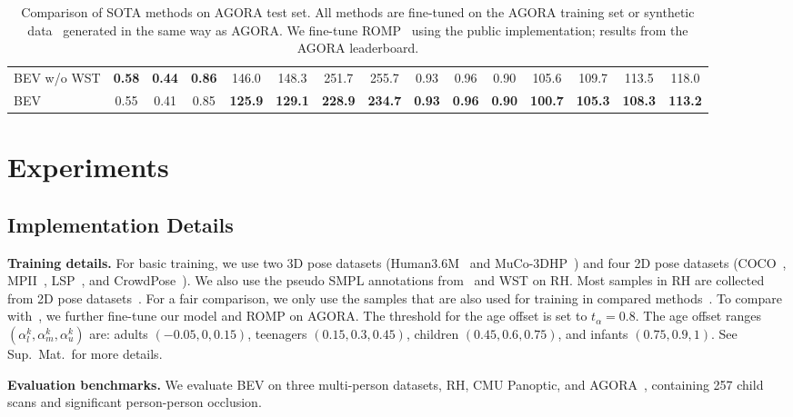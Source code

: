 \documentclass[10pt,twocolumn,letterpaper]{article}
\begin{document}
\begin{table*}[t]
\begin{tabular}{l|ccc|cc|cc|ccc|cc|cc}
BEV w/o WST  & \textbf{0.58} & \textbf{0.44} & \textbf{0.86} & 146.0 & 148.3 & 251.7 & 255.7 & 0.93 & 0.96 & 0.90 & 105.6 & 109.7 & 113.5 & 118.0\\
BEV  & 0.55 & 0.41 & 0.85 & \textbf{125.9} &\textbf{129.1} & \textbf{228.9} & \textbf{234.7} & \textbf{0.93} & \textbf{0.96} & \textbf{0.90} & \textbf{100.7} & \textbf{105.3} & \textbf{108.3} & \textbf{113.2} \\
\bottomrule
\end{tabular}
\vspace{-0.1in}
	\caption{Comparison of SOTA methods on AGORA test set. All methods are fine-tuned on the AGORA training set or synthetic data~\cite{Kocabas_SPEC_2021} generated in the same way as AGORA. We fine-tune ROMP~\cite{romp} using the public implementation; results from  the AGORA leaderboard.}
	\label{tab:agora}
\end{table*}



\section{Experiments}
\label{sec:experiments}

\subsection{Implementation Details}

\textbf{Training details.}
For basic training, we use two 3D pose datasets (Human3.6M~\cite{h36m} and MuCo-3DHP~\cite{mehta2018single}) and four 2D pose datasets (COCO~\cite{coco}, MPII~\cite{mpii}, LSP~\cite{lsp_extended}, and CrowdPose~\cite{crowdpose}). 
We also use the pseudo SMPL annotations from~\cite{joo2020eft} and WST on RH.
Most samples in RH are collected from 2D pose datasets~\cite{coco,crowdpose,zhang2019pose2seg}.
For a fair comparison, we only use the samples that are also used for training in compared methods~\cite{romp,moon2019camera,jiang2020coherent,zhen2020smap,kolotouros2019spin,Kocabas_SPEC_2021}.
To compare with~\cite{Kocabas_SPEC_2021,patel2021agora}, we further fine-tune our model and ROMP on AGORA.
The threshold for the age offset is set to $t_{\alpha}=0.8$.
The age offset ranges $(\alpha_{l}^k,\alpha_{m}^k,\alpha_{u}^k)$ are: adults $(-0.05, 0, 0.15)$, teenagers $(0.15, 0.3, 0.45)$, children $(0.45, 0.6, 0.75)$, and infants $(0.75, 0.9, 1)$.
See Sup.~Mat.~for more details. 


\textbf{Evaluation benchmarks.}
We evaluate BEV on three multi-person datasets, RH, CMU Panoptic, \cite{cmu_panoptic} and AGORA~\cite{patel2021agora}, containing 257 child scans and significant person-person occlusion. 
\end{document}
